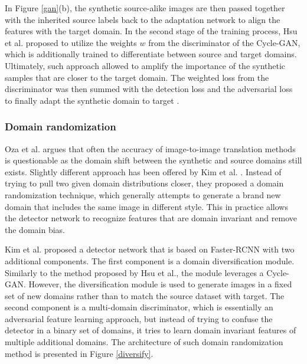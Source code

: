 \documentclass[english, 12pt, a4paper, elec, utf8, a-1b, online]{aaltothesis}
\begin{document}
In Figure \ref{gan}(b), the synthetic source-alike images are then passed together with the inherited source labels back to the adaptation network to align the features with the target domain. In the second stage of the training process, Hsu et al. proposed to utilize the weights $w$ from the discriminator of the Cycle-GAN, which is additionally trained to differentiate between source and target domains. Ultimately, such approach allowed to amplify the importance of the synthetic samples that are closer to the target domain. The weighted loss from the discriminator was then summed with the detection loss and the adversarial loss to finally adapt the synthetic domain to target \cite{Hsu2019}. 

\subsubsection{Domain randomization}

Oza et al. \cite{Oza2021} argues that often the accuracy of image-to-image translation methods is questionable as the domain shift between the synthetic and source domains still exists. Slightly different approach has been offered by Kim et al. \cite{Kim2019}. Instead of trying to pull two given domain distributions closer, they proposed a domain randomization technique, which generally attempts to generate a brand new domain that includes the same image in different style. This in practice allows the detector network to recognize features that are domain invariant and remove the domain bias. 

Kim et al. proposed a detector network that is based on Faster-RCNN with two additional components. The first component is a domain diversification module. Similarly to the method proposed by Hsu et al.\cite{Hsu2019}, the module leverages a Cycle-GAN\cite{Zhu2017}. However, the diversification module is used to generate images in a fixed set of new domains rather than to match the source dataset with target.  The second component is a multi-domain discriminator, which is essentially an adversarial feature learning approach, but instead of trying to confuse the detector in a binary set of domains, it tries to learn domain invariant features of multiple additional domains. The architecture of such domain randomization method is presented in Figure \ref{diversify}.
\end{document}
